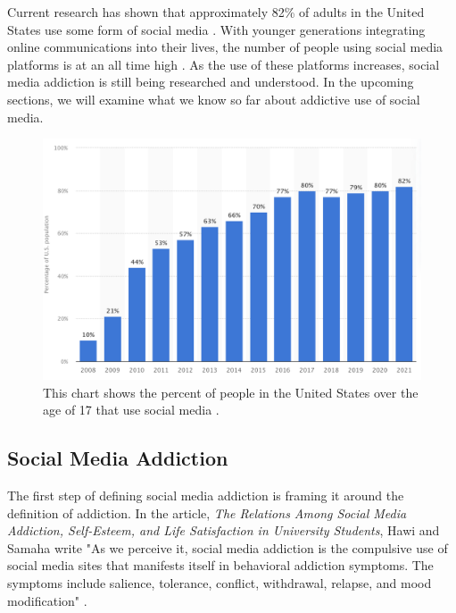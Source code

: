 \documentclass[12pt, journal, compsoc]{IEEEtran}
\begin{document}
Current research has shown that approximately 82\% of adults in the United States use some form of social media \cite{TotalUse}. With younger generations integrating online communications into their lives, the number of people using social media platforms is at an all time high \cite{TotalUse}. As the use of these platforms increases,  social media addiction is still being researched and understood. In the upcoming sections, we will examine what we know so far about addictive use of social media.

\begin{figure}[h]
    \noindent\includegraphics[width = \linewidth]{social media use.png}
    \caption{This chart shows the percent of people in the United States over the age of 17 that use social media \cite{TotalUse}.}
\end{figure}

\subsection{Social Media Addiction}

\hspace{12pt} The first step of defining social media addiction is framing it around the definition of addiction. In the article, \textit{The Relations Among Social Media Addiction, Self-Esteem, and Life Satisfaction in University Students}, Hawi and Samaha write "As we perceive it, social media addiction is the compulsive use of social media sites that manifests itself in behavioral addiction symptoms. The symptoms include salience, tolerance, conflict, withdrawal, relapse, and mood modification" \cite{UniversityStudents}. 
\end{document}
